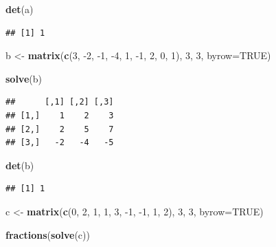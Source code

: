 \documentclass[]{article}
\newenvironment{Shaded}{\begin{snugshade}}{\end{snugshade}}
\newcommand{\DataTypeTok}[1]{\textcolor[rgb]{0.13,0.29,0.53}{#1}}
\newcommand{\DecValTok}[1]{\textcolor[rgb]{0.00,0.00,0.81}{#1}}
\newcommand{\KeywordTok}[1]{\textcolor[rgb]{0.13,0.29,0.53}{\textbf{#1}}}
\newcommand{\NormalTok}[1]{#1}
\newcommand{\OtherTok}[1]{\textcolor[rgb]{0.56,0.35,0.01}{#1}}
\newcommand{\StringTok}[1]{\textcolor[rgb]{0.31,0.60,0.02}{#1}}
\begin{document}
\begin{Shaded}
\begin{Highlighting}[]
\KeywordTok{det}\NormalTok{(a)}
\end{Highlighting}
\end{Shaded}

\begin{verbatim}
## [1] 1
\end{verbatim}

\begin{Shaded}
\begin{Highlighting}[]
\NormalTok{b <-}\StringTok{ }\KeywordTok{matrix}\NormalTok{(}\KeywordTok{c}\NormalTok{(}\DecValTok{3}\NormalTok{, }\DecValTok{-2}\NormalTok{, }\DecValTok{-1}\NormalTok{, }
              \DecValTok{-4}\NormalTok{, }\DecValTok{1}\NormalTok{, }\DecValTok{-1}\NormalTok{,}
              \DecValTok{2}\NormalTok{, }\DecValTok{0}\NormalTok{, }\DecValTok{1}\NormalTok{), }
              \DecValTok{3}\NormalTok{, }\DecValTok{3}\NormalTok{, }\DataTypeTok{byrow=}\OtherTok{TRUE}\NormalTok{)}

\KeywordTok{solve}\NormalTok{(b)}
\end{Highlighting}
\end{Shaded}

\begin{verbatim}
##      [,1] [,2] [,3]
## [1,]    1    2    3
## [2,]    2    5    7
## [3,]   -2   -4   -5
\end{verbatim}

\begin{Shaded}
\begin{Highlighting}[]
\KeywordTok{det}\NormalTok{(b)}
\end{Highlighting}
\end{Shaded}

\begin{verbatim}
## [1] 1
\end{verbatim}

\begin{Shaded}
\begin{Highlighting}[]
\NormalTok{c <-}\StringTok{ }\KeywordTok{matrix}\NormalTok{(}\KeywordTok{c}\NormalTok{(}\DecValTok{0}\NormalTok{, }\DecValTok{2}\NormalTok{, }\DecValTok{1}\NormalTok{, }
              \DecValTok{1}\NormalTok{, }\DecValTok{3}\NormalTok{, }\DecValTok{-1}\NormalTok{,}
              \DecValTok{-1}\NormalTok{, }\DecValTok{1}\NormalTok{, }\DecValTok{2}\NormalTok{), }
              \DecValTok{3}\NormalTok{, }\DecValTok{3}\NormalTok{, }\DataTypeTok{byrow=}\OtherTok{TRUE}\NormalTok{)}

\KeywordTok{fractions}\NormalTok{(}\KeywordTok{solve}\NormalTok{(c))}
\end{Highlighting}
\end{Shaded}
\end{document}
